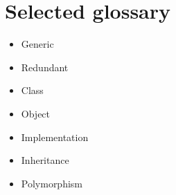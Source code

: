 \section*{Selected glossary}
\begin{frame}
\begin{itemize}
\setlength\itemsep{1em}
\item Generic
\item Redundant
\item Class
\item Object
\item Implementation
\item Inheritance
\item Polymorphism
\end{itemize}
\end{frame}

%
%
%
%
